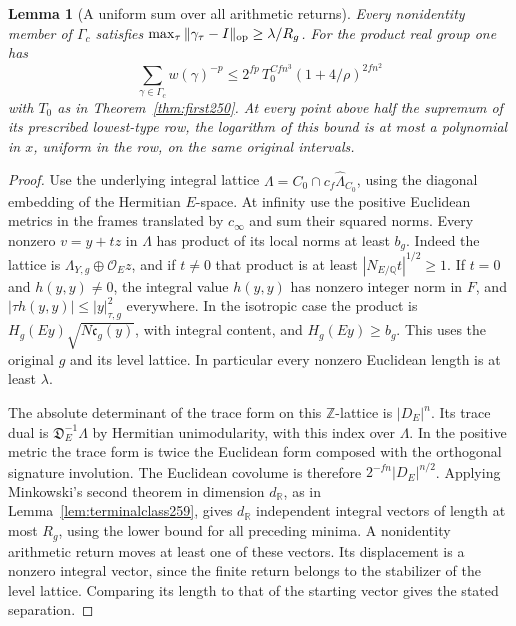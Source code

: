 \documentclass[a4paper,11pt]{article}
\newtheorem{lemma}[proposition]{Lemma}
\theoremstyle{definition}
\theoremstyle{remark}
\numberwithin{equation}{section}
\begin{document}
\begin{lemma}[A uniform sum over all arithmetic returns]\leavevmode
\label{lem:returns261}
Every nonidentity member of \(\Gamma_c\) satisfies
\(\max_\tau\|\gamma_\tau-I\|_{\rm op}\ge\lambda/R_g\).
For the product real group one has
\[
 \sum_{\gamma\in\Gamma_c} w(\gamma)^{-p}
 \le 2^{fp}\,T_0^{Cfn^3}(1+4/\rho)^{2fn^2}
\]
with \(T_0\) as in Theorem~\ref{thm:first250}. At every
point above half the supremum of its prescribed lowest-type
row, the logarithm of this bound is at most a polynomial in
\(x\), uniform in the row, on the same original intervals.
\end{lemma}
\begin{proof}
Use the underlying integral lattice
\(\Lambda= C_0\cap c_f\widehat\Lambda_{C_0}\), using the
diagonal embedding of the Hermitian \(E\)-space.
At infinity use the positive Euclidean metrics in the frames
translated by \(c_\infty\) and sum their squared norms. Every
nonzero \(v=y+t z\) in \(\Lambda\) has product of its local
norms at least \(b_g\). Indeed the lattice is
\(\Lambda_{Y,g}\oplus\mathcal O_Ez\), and if \(t\ne0\) that
product is at least \(|N_{E/\mathbb Q}t|^{1/2}\ge1\).
If \(t=0\) and \(h(y,y)\ne0\), the integral value \(h(y,y)\)
has nonzero integer norm in \(F\), and
\(|\tau h(y,y)|\le |y|_{\tau,g}^2\) everywhere. In the
isotropic case the product is \(H_g(Ey)\sqrt{N\mathfrak c_g(y)}\),
with integral content, and \(H_g(Ey)\ge b_g\). This uses the
original \(g\) and its level lattice. In particular every
nonzero Euclidean length is at least \(\lambda\).

The absolute determinant of the trace form on this
\(\mathbb Z\)-lattice is \(|D_E|^n\). Its trace dual is
\(\mathfrak D_E^{-1}\Lambda\) by Hermitian unimodularity,
with this index over \(\Lambda\). In the positive metric the
trace form is twice the Euclidean form composed with the
orthogonal signature involution. The Euclidean covolume is
therefore \(2^{-fn}|D_E|^{n/2}\). Applying Minkowski's second
theorem in dimension \(d_{\mathbb R}\), as in
Lemma~\ref{lem:terminalclass259}, gives \(d_{\mathbb R}\)
independent integral vectors of length at most \(R_g\), using
the lower bound for all preceding minima. A nonidentity
arithmetic return moves at least one of these vectors.
Its displacement is a nonzero integral vector, since the finite
return belongs to the stabilizer of the level lattice. Comparing
its length to that of the starting vector gives the stated
separation.


\end{proof}
\end{document}
